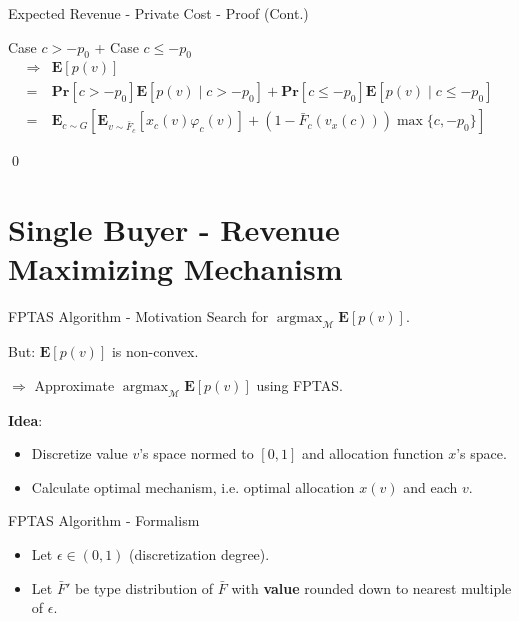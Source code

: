 \documentclass{beamer}
\begin{document}
\begin{frame}{Expected Revenue - Private Cost - Proof (Cont.)}

  Case $c > -p_0$ + Case $c \leq -p_0$
  \begin{align*}
    \Rightarrow & \mathbf{E}\left[p(v)\right]                                                                                                            \\
    =           & \mathbf{Pr}[c > -p_0]\mathbf{E}\left[p(v) \mid c > -p_0\right] + \mathbf{Pr}[c \leq -p_0]\mathbf{E}\left[p(v) \mid c \leq -p_0\right]  \\
    =           & \mathbf{E}_{c \sim G}\left[\mathbf{E}_{v \sim \bar{F}_c}\left[x_c(v)\varphi_c(v)\right] + (1-\bar{F}_c(v_x(c))) \max\{c, -p_0\}\right]
  \end{align*}

  \qed
\end{frame}

\section{Single Buyer - Revenue Maximizing Mechanism}

\begin{frame}{FPTAS Algorithm - Motivation}
  Search for $\operatorname{argmax}_{\mathcal{M}} \mathbf{E}\left[p(v)\right]$.

  But: $\mathbf{E}\left[p(v)\right]$ is non-convex.

  $\Rightarrow$ Approximate $\operatorname{argmax}_{\mathcal{M}} \mathbf{E}\left[p(v)\right]$ using FPTAS.

  \textbf{Idea}:
  \begin{itemize}
    \item Discretize value $v$'s space normed to $[0,1]$ and allocation function $x$'s space.
    \item Calculate optimal mechanism, i.e. optimal allocation $x(v)$ and each $v$.
  \end{itemize}

\end{frame}

\begin{frame}{FPTAS Algorithm - Formalism}
  \begin{itemize}
    \item Let $\epsilon \in (0,1)$ (discretization degree).
    \item Let $\bar{F}'$ be type distribution of $\bar{F}$ with \textbf{value} rounded down to nearest multiple of $\epsilon$.
  \end{itemize}
\end{frame}
\end{document}
